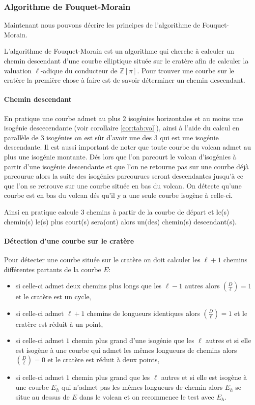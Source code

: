 \documentclass[10pt,a4paper]{book}
\theoremstyle{plain}
\theoremstyle{definition}
\theoremstyle{definition}
\theoremstyle{definition}
\theoremstyle{definition}
\theoremstyle{remark}
\theoremstyle{remark}
\theoremstyle{definition}
\begin{document}
\subsubsection{Algorithme de Fouquet-Morain}
\label{sub:alg:FM}
Maintenant nous pouvons décrire les principes de l'algorithme de Fouquet-Morain.

L'algorithme de Fouquet-Morain \cite{FouquetMorain02} est un algorithme qui cherche à calculer un chemin descendant d'une courbe elliptique située sur le cratère afin de calculer la valuation $\ell$-adique du conducteur de $\mathbb{Z}[\pi]$. Pour trouver une courbe sur le cratère la première chose à faire est de savoir déterminer un chemin descendant. 

\paragraph{Chemin descendant}
En pratique une courbe admet au plus $2$ isogénies horizontales et au moins une isogénie descecendante (voir corollaire \ref{cor:tab:vol}), ainsi à l'aide du calcul en parallèle de 3 isogénies on est sûr d'avoir une des 3 qui est une isogénie descendante. Il est aussi important de noter que toute courbe du volcan admet au plus une isogénie montante. Dés lors que l'on parcourt le volcan d'isogénies à partir d'une isogénie descendante et que l'on ne retourne pas sur une courbe déjà parcourue alors la suite des isogénies parcourues seront descendantes jusqu'à ce que l'on se retrouve sur une courbe située en bas du volcan. On détecte qu'une courbe est en bas du volcan dés qu'il y a une seule courbe isogène à celle-ci.

Ainsi en pratique \cite{FouquetMorain02} calcule 3 chemins à partir de la courbe de départ et le(s) chemin(s) le(s) plus court(s) sera(ont) alors un(des) chemin(s) descendant(s). 

\paragraph{Détection d'une courbe sur le cratère}
Pour détecter une courbe située sur le cratère on doit calculer les $\ell+1$ chemins différentes partants de la courbe $E$:
\begin{itemize}
\item si celle-ci admet deux chemins plus longs que les $\ell-1$ autres alors $\left( \frac{D}{\ell} \right) = 1$ et le cratère est un cycle,
\item si celle-ci admet $\ell+1$ chemins de longueurs identiques alors $\left( \frac{D}{\ell} \right) = 1$ et le cratère est réduit à un point,
\item si celle-ci admet $1$ chemin plus grand d'une isogénie que les $\ell$ autres et si elle est isogène à une courbe qui admet les mêmes longueurs de chemins alors $\left( \frac{D}{\ell} \right) = 0$ et le cratère est réduit à deux points,
\item si celle-ci admet $1$ chemin plus grand que les $\ell$ autres et si elle est isogène à une courbe $E_h$ qui n'admet pas les mêmes longueurs de chemin alors $E_h$ se situe au dessus de $E$ dans le volcan et on recommence le test avec $E_h$.
\end{itemize}
\end{document}
